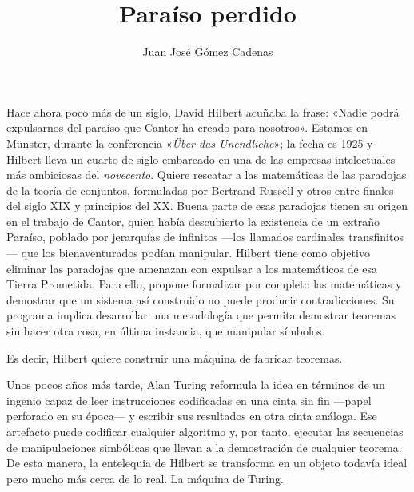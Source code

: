 \documentclass[11pt,a4paper]{article}
\title{Paraíso perdido}
\author{Juan José Gómez Cadenas}
\date{}
\begin{document}
\maketitle


Hace ahora poco más de un siglo, David Hilbert acuñaba la frase: «Nadie podrá expulsarnos del paraíso que Cantor ha creado para nosotros». Estamos en Münster, durante la conferencia «\emph{Über das Unendliche}»; la fecha es 1925 y Hilbert lleva un cuarto de siglo embarcado en una de las empresas intelectuales más ambiciosas del \emph{novecento}. Quiere rescatar a las matemáticas de las paradojas de la teoría de conjuntos, formuladas por Bertrand Russell y otros entre finales del siglo XIX y principios del XX. Buena parte de esas paradojas tienen su origen en el trabajo de Cantor, quien había descubierto la existencia de un extraño Paraíso, poblado por jerarquías de infinitos ---los llamados cardinales transfinitos--- que los bienaventurados podían manipular. Hilbert tiene como objetivo eliminar las paradojas que amenazan con expulsar a los matemáticos de esa Tierra Prometida. Para ello, propone formalizar por completo las matemáticas y demostrar que un sistema así construido no puede producir contradicciones. Su programa implica desarrollar una metodología que permita demostrar teoremas sin hacer otra cosa, en última instancia, que manipular símbolos. 

Es decir, Hilbert quiere construir una máquina de fabricar teoremas.

Unos pocos años más tarde, Alan Turing reformula la idea en términos de un ingenio capaz de leer instrucciones codificadas en una cinta sin fin ---papel perforado en su época--- y escribir sus resultados en otra cinta análoga. Ese artefacto puede codificar cualquier algoritmo y, por tanto, ejecutar las secuencias de manipulaciones simbólicas que llevan a la demostración de cualquier teorema. De esta manera, la entelequia de Hilbert se transforma en un objeto todavía ideal pero mucho más cerca de lo real. La máquina de Turing. 
\end{document}

